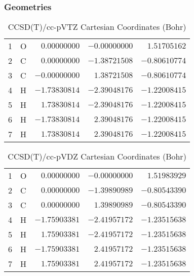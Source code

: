 \documentclass[10pt,oneside]{article}
\begin{document}
\clearpage

\subsection{\ \ \ }

\subsubsection*{Geometries}
\begin{table}[h!]
\centering
\caption{CCSD(T)/cc-pVTZ Cartesian Coordinates (Bohr)}
\begin{tabular}{llrrr}
1  & O  & $ 0.00000000$ & $-0.00000000$ & $ 1.51705162$ \\
2  & C  & $ 0.00000000$ & $-1.38721508$ & $-0.80610774$ \\
3  & C  & $-0.00000000$ & $ 1.38721508$ & $-0.80610774$ \\
4  & H  & $-1.73830814$ & $-2.39048176$ & $-1.22008415$ \\
5  & H  & $ 1.73830814$ & $-2.39048176$ & $-1.22008415$ \\
6  & H  & $-1.73830814$ & $ 2.39048176$ & $-1.22008415$ \\
7  & H  & $ 1.73830814$ & $ 2.39048176$ & $-1.22008415$ \\
\end{tabular}
\end{table}

\begin{table}[h!]
\centering
\caption{CCSD(T)/cc-pVDZ Cartesian Coordinates (Bohr)}
\begin{tabular}{llrrr}
1  & O  & $ 0.00000000$ & $-0.00000000$ & $ 1.51983929$ \\
2  & C  & $ 0.00000000$ & $-1.39890989$ & $-0.80543390$ \\
3  & C  & $ 0.00000000$ & $ 1.39890989$ & $-0.80543390$ \\
4  & H  & $-1.75903381$ & $-2.41957172$ & $-1.23515638$ \\
5  & H  & $ 1.75903381$ & $-2.41957172$ & $-1.23515638$ \\
6  & H  & $-1.75903381$ & $ 2.41957172$ & $-1.23515638$ \\
7  & H  & $ 1.75903381$ & $ 2.41957172$ & $-1.23515638$ \\
\end{tabular}
\end{table}
\end{document}

